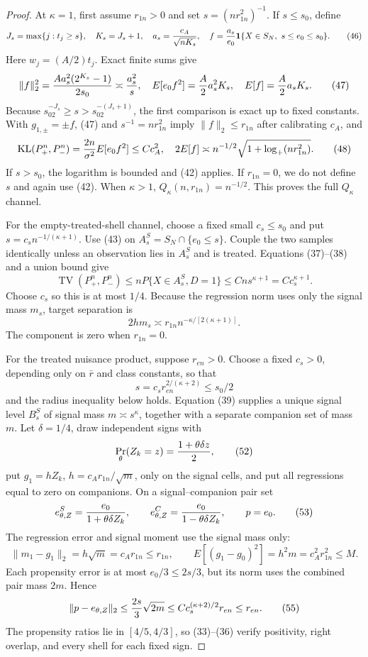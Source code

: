 \documentclass{article}
\begin{document}
\begin{proof}
At \(\kappa=1\), first assume \(r_{1n}>0\) and set
\(s=(nr_{1n}^2)^{-1}\).  If \(s\leq s_0\), define
\[
J_s=\max\{j:t_j\geq s\},\quad K_s=J_s+1,\quad
a_s={c_A\over\sqrt{nK_s}},\quad
f={a_s\over e_0}\mathbf 1\{X\in S_N,\ s\leq e_0\leq s_0\}. \tag{46}
\]
Here \(w_j=(A/2)t_j\).  Exact finite sums give
\[
\|f\|_2^2={Aa_s^2(2^{K_s}-1)\over2s_0}\asymp{a_s^2\over s},
\quad E[e_0f^2]={A\over2}a_s^2K_s,
\quad E[f]={A\over2}a_sK_s.                               \tag{47}
\]
Because \(s_02^{-J_s}\geq s>s_02^{-(J_s+1)}\), the first comparison is exact
up to fixed constants.  With \(g_{1,\pm}=\pm f\), (47) and
\(s^{-1}=nr_{1n}^2\) imply \(\|f\|_2\leq r_{1n}\) after calibrating \(c_A\),
and
\[
\operatorname{KL}(P_+^n,P_-^n)
={2n\over\sigma^2}E[e_0f^2]\leq Cc_A^2,
\quad
2E[f]\asymp n^{-1/2}\sqrt{1+\log_+(nr_{1n}^2)}.            \tag{48}
\]
If \(s>s_0\), the logarithm is bounded and (42) applies.  If \(r_{1n}=0\),
we do not define \(s\) and again use (42).  When \(\kappa>1\),
\(Q_\kappa(n,r_{1n})=n^{-1/2}\).  This proves the full \(Q_\kappa\) channel.

For the empty-treated-shell channel, choose a fixed small \(c_s\leq s_0\) and
put \(s=c_sn^{-1/(\kappa+1)}\).  Use (43) on
\(A_s^S=S_N\cap\{e_0\leq s\}\).  Couple the two samples identically unless an
observation lies in \(A_s^S\) and is treated.  Equations (37)--(38) and a union
bound give
\[
\operatorname{TV}(P_+^n,P_-^n)
\leq nP\{X\in A_s^S,D=1\}
\leq Cns^{\kappa+1}=Cc_s^{\kappa+1}.                       \tag{49}
\]
Choose \(c_s\) so this is at most \(1/4\).  Because the regression norm uses
only the signal mass \(m_s\), target separation is
\[
2hm_s\asymp r_{1n}n^{-\kappa/[2(\kappa+1)]}.               \tag{50}
\]
The component is zero when \(r_{1n}=0\).

For the treated nuisance product, suppose \(r_{en}>0\).  Choose a fixed
\(c_s>0\), depending only on \(\bar r\) and class constants, so that
\[
s=c_sr_{en}^{2/(\kappa+2)}\leq s_0/2                      \tag{51}
\]
and the radius inequality below holds.  Equation (39) supplies a unique signal
level \(B_s^S\) of signal mass \(m\asymp s^\kappa\), together with a separate
companion set of mass \(m\).  Let \(\delta=1/4\), draw independent signs with
\[
\Pr_\theta(Z_k=z)={1+\theta\delta z\over2},                 \tag{52}
\]
put \(g_1=hZ_k\), \(h=c_A r_{1n}/\sqrt m\), only on the signal cells, and put
all regressions equal to zero on companions.  On a signal--companion pair set
\[
e^S_{\theta,Z}={e_0\over1+\theta\delta Z_k},\quad\quad
e^C_{\theta,Z}={e_0\over1-\theta\delta Z_k},\quad\quad p=e_0.   \tag{53}
\]
The regression error and signal moment use the signal mass only:
\[
\|m_1-g_1\|_2=h\sqrt m=c_A r_{1n}\leq r_{1n},
\quad\quad E[(g_1-g_0)^2]=h^2m=c_A^2r_{1n}^2\leq M.             \tag{54}
\]
Each propensity error is at most \(e_0/3\leq2s/3\), but its norm uses the
combined pair mass \(2m\).  Hence
\[
\|p-e_{\theta,Z}\|_2
\leq {2s\over3}\sqrt{2m}
\leq Cc_s^{(\kappa+2)/2}r_{en}\leq r_{en}.                 \tag{55}
\]
The propensity ratios lie in \([4/5,4/3]\), so (33)--(36) verify positivity,
right overlap, and every shell for each fixed sign.


\end{proof}
\end{document}
